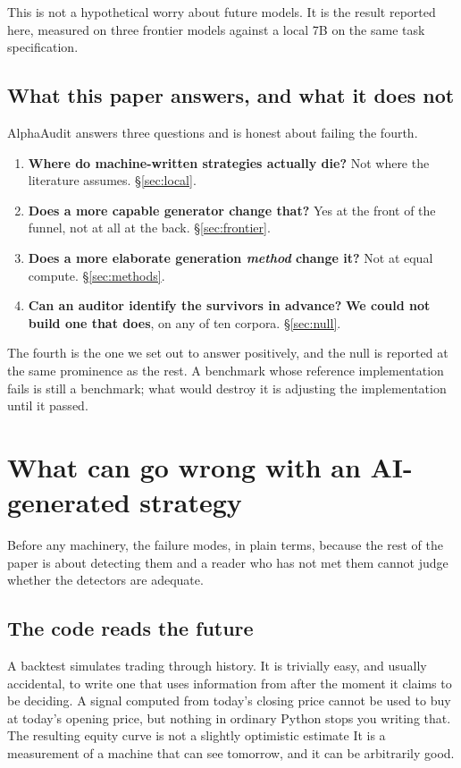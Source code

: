 \documentclass[11pt,a4paper]{article}
\begin{document}
This is not a hypothetical worry about future models. It is the result reported here, measured on
three frontier models against a local 7B on the same task specification.

\subsection{What this paper answers, and what it does not}

AlphaAudit answers three questions and is honest about failing the fourth.

\begin{enumerate}
\item \textbf{Where do machine-written strategies actually die?} Not where the literature
assumes. \S\ref{sec:local}.
\item \textbf{Does a more capable generator change that?} Yes at the front of the funnel,
not at all at the back. \S\ref{sec:frontier}.
\item \textbf{Does a more elaborate generation \emph{method} change it?} Not at equal
compute. \S\ref{sec:methods}.
\item \textbf{Can an auditor identify the survivors in advance?} \textbf{We could not build
one that does}, on any of ten corpora. \S\ref{sec:null}.
\end{enumerate}

The fourth is the one we set out to answer positively, and the null is reported at the same
prominence as the rest. A benchmark whose reference implementation fails is still a benchmark;
what would destroy it is adjusting the implementation until it passed.

\section{What can go wrong with an AI-generated strategy}
\label{sec:whatgoeswrong}

Before any machinery, the failure modes, in plain terms, because the rest of the paper is
about detecting them and a reader who has not met them cannot judge whether the detectors are
adequate.

\subsection{The code reads the future}

A backtest simulates trading through history. It is trivially easy, and usually accidental, to
write one that uses information from after the moment it claims to be deciding. A signal computed
from today's closing price cannot be used to buy at today's opening price, but nothing in ordinary
Python stops you writing that. The resulting equity curve is not a slightly optimistic estimate
It is a measurement of a machine that can see tomorrow, and it can be arbitrarily good.
\end{document}
